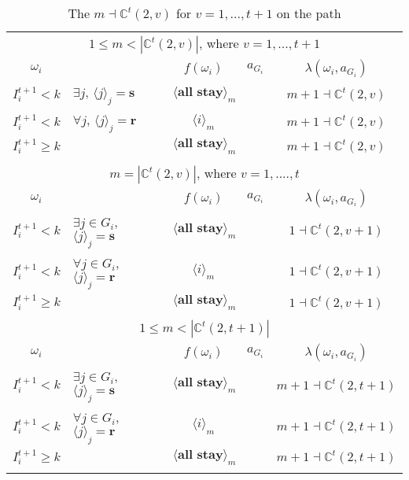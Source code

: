 \documentclass[12pt,letter]{article}
\newcommand{\Kappa}{\mathbb{C}}
\theoremstyle{definition}
\theoremstyle{definition}
\theoremstyle{remark}
\theoremstyle{claim}
\begin{document}
\begin{table}[!htbp]
\caption{The $m\dashv\Kappa^t(2,v)$ for $v=1,...,t+1$ on the path}
\label{table:eqm_path_kt2}
\begin{center}
\begin{tabular}{c l | c | c | c}
\multicolumn{5}{c}{$1\leq m < |\Kappa^t(2,v)|$, where $v=1,...,t+1$}\\
$\omega_i$ 	 & 	   &	$f(\omega_i)$  &	$a_{G_i}$ & $\lambda(\omega_i,a_{G_i})$ \\
\hline
\hline
$I^{t+1}_i< k$  	& 	$\exists j$, $\langle j \rangle_j=\textbf{s}$	& $\langle \textbf{all stay} \rangle_m$		&  	& $m+1\dashv \Kappa^t(2,v)$\\
$I^{t+1}_i< k$  	& 	$\forall j$, $\langle j \rangle_j=\textbf{r}$	& $\langle i \rangle_m$		&  	& $m+1\dashv \Kappa^t(2,v)$\\
$I^{t+1}_i\geq k$	 & 				& $\langle \textbf{all stay} \rangle_m$ 	& 		& $m+1\dashv \Kappa^t(2,v)$\\
\hline
\\
\multicolumn{5}{c}{$m= |\Kappa^t(2,v)|$, where $v=1,....,t$}\\
$\omega_i$ 	 & 	   &	$f(\omega_i)$  &	$a_{G_i}$ & $\lambda(\omega_i,a_{G_i})$ \\
\hline
\hline
$I^{t+1}_i< k$  	& 	$\exists j\in G_i$, $\langle j \rangle_j=\textbf{s}$	& $\langle \textbf{all stay} \rangle_m$		&  	& $1\dashv \Kappa^t(2,v+1)$\\
$I^{t+1}_i< k$  	& 	$\forall j\in G_i$, $\langle j \rangle_j=\textbf{r}$	& $\langle i \rangle_m$		&  	& $1\dashv \Kappa^t(2,v+1)$\\
$I^{t+1}_i\geq k$	 & 				& $\langle \textbf{all stay} \rangle_m$ 	& 		& $1\dashv \Kappa^t(2,v+1)$\\
\hline
\\
\multicolumn{5}{c}{$1\leq m < |\Kappa^t(2,t+1)|$}\\
$\omega_i$ 	 & 	   &	$f(\omega_i)$  &	$a_{G_i}$ & $\lambda(\omega_i,a_{G_i})$ \\
\hline
\hline
$I^{t+1}_i< k$  	& 	$\exists j\in G_i$, $\langle j \rangle_j=\textbf{s}$	& $\langle \textbf{all stay} \rangle_m$		&  	& $m+1\dashv \Kappa^t(2,t+1)$\\
$I^{t+1}_i< k$  	& 	$\forall j\in G_i$, $\langle j \rangle_j=\textbf{r}$	& $\langle i \rangle_m$		&  	& $m+1\dashv \Kappa^t(2,t+1)$\\
$I^{t+1}_i\geq k$	 & 				& $\langle \textbf{all stay} \rangle_m$ 	& 		& $m+1\dashv \Kappa^t(2,t+1)$\\
\hline
\\

\end{tabular}
\end{center}
\end{table}
\end{document}
